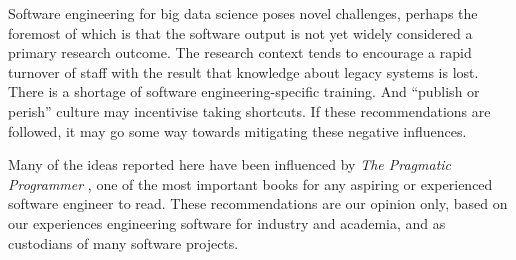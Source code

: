 \documentclass{bmcart}
\begin{document}
Software engineering for big data science poses novel challenges, perhaps the foremost of which is that the software output is not yet widely considered a primary research outcome. The research context tends to encourage a rapid turnover of staff with the result that knowledge about legacy systems is lost. There is a shortage of software engineering-specific training. And ``publish or perish'' culture may incentivise taking shortcuts. If these recommendations are followed, it may go some way towards mitigating these negative influences. 

Many of the ideas reported here have been influenced by \textit{The Pragmatic Programmer} \cite{pragprog}, one of the most important books for any aspiring or experienced software engineer to read. These recommendations are our opinion only, based on our experiences engineering software for industry and academia, and as custodians of many software projects. 

\end{document}
